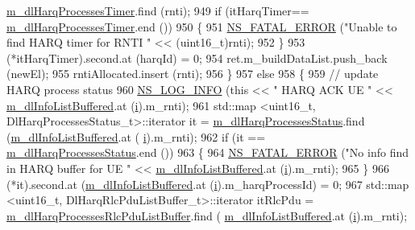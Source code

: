 \begin{DoxyCode}
      \hyperlink{classns3_1_1RrFfMacScheduler_ab5040cff67dad6c8fdfc9c32c90916df}{m\_dlHarqProcessesTimer}.find (rnti);
949           \textcolor{keywordflow}{if} (itHarqTimer== \hyperlink{classns3_1_1RrFfMacScheduler_ab5040cff67dad6c8fdfc9c32c90916df}{m\_dlHarqProcessesTimer}.end ())
950             \{
951               \hyperlink{group__fatal_ga5131d5e3f75d7d4cbfd706ac456fdc85}{NS\_FATAL\_ERROR} (\textcolor{stringliteral}{"Unable to find HARQ timer for RNTI "} << (uint16\_t)rnti);
952             \}
953           (*itHarqTimer).second.at (harqId) = 0;
954           ret.m\_buildDataList.push\_back (newEl);
955           rntiAllocated.insert (rnti);
956         \}
957       \textcolor{keywordflow}{else}
958         \{
959           \textcolor{comment}{// update HARQ process status}
960           \hyperlink{group__logging_gafbd73ee2cf9f26b319f49086d8e860fb}{NS\_LOG\_INFO} (\textcolor{keyword}{this} << \textcolor{stringliteral}{" HARQ ACK UE "} << 
      \hyperlink{classns3_1_1RrFfMacScheduler_a4176ffb0eba681a3e3b5be0be1a30771}{m\_dlInfoListBuffered}.at (\hyperlink{bernuolliDistribution_8m_a6f6ccfcf58b31cb6412107d9d5281426}{i}).m\_rnti);
961           std::map <uint16\_t, DlHarqProcessesStatus\_t>::iterator it = 
      \hyperlink{classns3_1_1RrFfMacScheduler_aa3d12b5abcb9afeea093150a6572aaed}{m\_dlHarqProcessesStatus}.find (\hyperlink{classns3_1_1RrFfMacScheduler_a4176ffb0eba681a3e3b5be0be1a30771}{m\_dlInfoListBuffered}.at (
      \hyperlink{bernuolliDistribution_8m_a6f6ccfcf58b31cb6412107d9d5281426}{i}).m\_rnti);
962           \textcolor{keywordflow}{if} (it == \hyperlink{classns3_1_1RrFfMacScheduler_aa3d12b5abcb9afeea093150a6572aaed}{m\_dlHarqProcessesStatus}.end ())
963             \{
964               \hyperlink{group__fatal_ga5131d5e3f75d7d4cbfd706ac456fdc85}{NS\_FATAL\_ERROR} (\textcolor{stringliteral}{"No info find in HARQ buffer for UE "} << 
      \hyperlink{classns3_1_1RrFfMacScheduler_a4176ffb0eba681a3e3b5be0be1a30771}{m\_dlInfoListBuffered}.at (\hyperlink{bernuolliDistribution_8m_a6f6ccfcf58b31cb6412107d9d5281426}{i}).m\_rnti);
965             \}
966           (*it).second.at (\hyperlink{classns3_1_1RrFfMacScheduler_a4176ffb0eba681a3e3b5be0be1a30771}{m\_dlInfoListBuffered}.at (\hyperlink{bernuolliDistribution_8m_a6f6ccfcf58b31cb6412107d9d5281426}{i}).m\_harqProcessId) = 0;
967           std::map <uint16\_t, DlHarqRlcPduListBuffer\_t>::iterator itRlcPdu =  
      \hyperlink{classns3_1_1RrFfMacScheduler_a2a6afd0a7df7a71c20382176f6cc9573}{m\_dlHarqProcessesRlcPduListBuffer}.find (
      \hyperlink{classns3_1_1RrFfMacScheduler_a4176ffb0eba681a3e3b5be0be1a30771}{m\_dlInfoListBuffered}.at (\hyperlink{bernuolliDistribution_8m_a6f6ccfcf58b31cb6412107d9d5281426}{i}).m\_rnti);

\end{DoxyCode}
